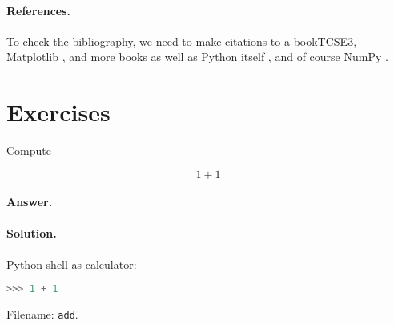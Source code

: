 \documentclass[graybox,sectrefs,envcountresetchap,open=right,final]{svmonodo}
\makeatletter
\newenvironment{doconceexercise}{}{}
\newcounter{doconceexercisecounter}%
\newcommand\listofexercises{
\chapter*{List of Problems
          \@mkboth{List of Problems}{List of Problems}}
\markboth{List of Problems}{List of Problems}
\@starttoc{loe}
}
\makeatother
\begin{document}
\paragraph{References.}
To check the bibliography, we need to make citations to a book{TCSE3},
Matplotlib \cite{Matplotlib:paper}, and more books \cite{Mertz,PythonQt}
as well as Python itself \cite{Python}, and of course NumPy
\cite{NumPy}.

\section{Exercises}

\begin{doconceexercise}

                
\label{exer:add}

Compute

\[ 1 + 1 \]

\paragraph{Answer.}



\paragraph{Solution.}
Python shell as calculator:




\begin{lstlisting}[language=Python,style=simple,xleftmargin=2mm]
>>> 1 + 1


\end{lstlisting}


\noindent Filename: \texttt{add}.

\end{doconceexercise}
\end{document}
